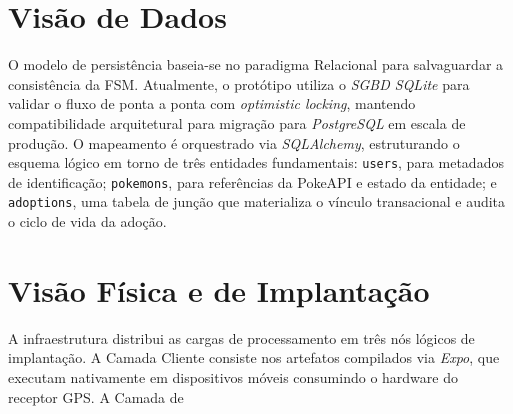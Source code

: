 \section{Visão de Dados}

O modelo de persistência baseia-se no paradigma Relacional para salvaguardar a consistência da FSM. Atualmente, o protótipo utiliza o \textit{SGBD SQLite} para validar o fluxo de ponta a ponta com \textit{optimistic locking}, mantendo compatibilidade arquitetural para migração para \textit{PostgreSQL} em escala de produção. O mapeamento é orquestrado via \textit{SQLAlchemy}, estruturando o esquema lógico em torno de três entidades fundamentais: \texttt{users}, para metadados de identificação; \texttt{pokemons}, para referências da PokeAPI e estado da entidade; e \texttt{adoptions}, uma tabela de junção que materializa o vínculo transacional e audita o ciclo de vida da adoção.

\section{Visão Física e de Implantação}

A infraestrutura distribui as cargas de processamento em três nós lógicos de implantação. A Camada Cliente consiste nos artefatos compilados via \textit{Expo}, que executam nativamente em dispositivos móveis consumindo o hardware do receptor GPS. A Camada de